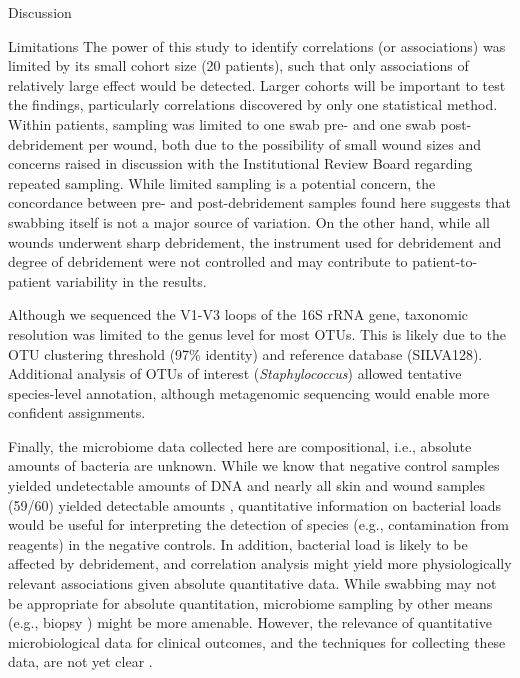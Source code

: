 \documentclass[oneside,12pt,final]{sty/ucthesis-CA2012}
\begin{document}
\begin{mainmatter}
\begin{section}{Discussion}
\begin{subsection}{Limitations}
The power of this study to identify correlations (or associations) was limited by its small cohort size (20 patients), such that only associations of relatively large effect would be detected. Larger cohorts will be important to test the findings, particularly correlations discovered by only one statistical method. Within patients, sampling was limited to one swab pre- and one swab post-debridement per wound, both due to the possibility of small wound sizes and concerns raised in discussion with the Institutional Review Board regarding repeated sampling. While limited sampling is a potential concern, the concordance between pre- and post-debridement samples found here suggests that swabbing itself is not a major source of variation. On the other hand, while all wounds underwent sharp debridement, the instrument used for debridement and degree of debridement were not controlled and may contribute to patient-to-patient variability in the results. 

Although we sequenced the V1-V3 loops of the 16S rRNA gene, taxonomic resolution was limited to the genus level for most OTUs. This is likely due to the OTU clustering threshold (97\% identity) and reference database (SILVA128). Additional analysis of OTUs of interest (\textit{Staphylococcus}) allowed tentative species-level annotation, although metagenomic sequencing would enable more confident assignments. 

Finally, the microbiome data collected here are compositional, i.e., absolute amounts of bacteria are unknown. While we know that negative control samples yielded undetectable amounts of DNA and nearly all skin and wound samples (59/60) yielded detectable amounts \cite{RN41}, quantitative information on bacterial loads would be useful for interpreting the detection of species (e.g., contamination from reagents) in the negative controls. In addition, bacterial load is likely to be affected by debridement, and correlation analysis might yield more physiologically relevant associations given absolute quantitative data. While swabbing may not be appropriate for absolute quantitation, microbiome sampling by other means (e.g., biopsy \cite{RN26}) might be more amenable. However, the relevance of quantitative microbiological data for clinical outcomes, and the techniques for collecting these data, are not yet clear \cite{RN24}. 
\end{subsection}
\end{section}


\end{mainmatter}
\end{document}
